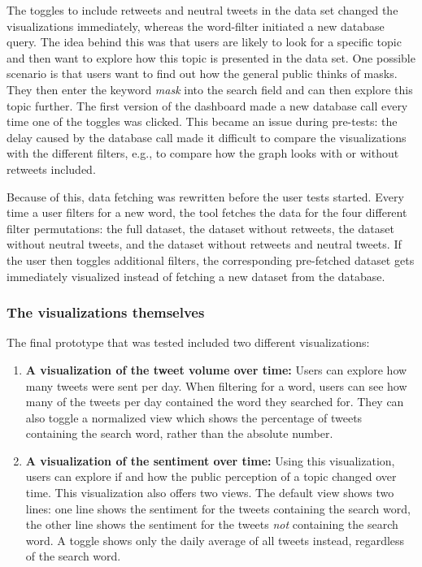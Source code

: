 The toggles to include retweets and neutral tweets in the data set changed the visualizations immediately, whereas the word-filter initiated a new database query. The idea behind this was that users are likely to look for a specific topic and then want to explore how this topic is presented in the data set. One possible scenario is that users want to find out how the general public thinks of masks. They then enter the keyword \emph{mask} into the search field and can then explore this topic further. The first version of the dashboard made a new database call every time one of the toggles was clicked. This became an issue during pre-tests: the delay caused by the database call made it difficult to compare the visualizations with the different filters, e.g., to compare how the graph looks with or without retweets included.

Because of this, data fetching was rewritten before the user tests started. Every time a user filters for a new word, the tool fetches the data for the four different filter permutations: the full dataset, the dataset without retweets, the dataset without neutral tweets, and the dataset without retweets and neutral tweets. If the user then toggles additional filters, the corresponding pre-fetched dataset gets immediately visualized instead of fetching a new dataset from the database.

\subsubsection{The visualizations themselves}
The final prototype that was tested included two different visualizations:
\begin{enumerate}
    \item \textbf{A visualization of the tweet volume over time:} Users can explore how many tweets were sent per day. When filtering for a word, users can see how many of the tweets per day contained the word they searched for. They can also toggle a normalized view which shows the percentage of tweets containing the search word, rather than the absolute number.
    \item \textbf{A visualization of the sentiment over time:} Using this visualization, users can explore if and how the public perception of a topic changed over time. This visualization also offers two views. The default view shows two lines: one line shows the sentiment for the tweets containing the search word, the other line shows the sentiment for the tweets \emph{not} containing the search word. A toggle shows only the daily average of all tweets instead, regardless of the search word.
\end{enumerate}

